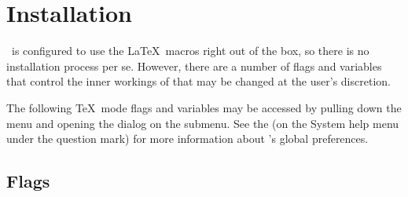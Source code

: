 \documentclass{report}
\begin{document}
\section{Installation}

\Alpha\ is configured to use the \LaTeX\ macros right out of the box, 
so there is no installation process per se.  However, there are a 
number of flags and variables that control the inner workings of 
 that may be changed at the user's discretion.  

The following \TeX\ mode flags and variables may be accessed by 
pulling down the  menu and opening the 
 dialog on the  submenu.  See 
the  (on the System help menu under the question 
mark) for more information about \Alpha's global preferences.

\subsection{Flags}
\label{sec:flags}
\end{document}
